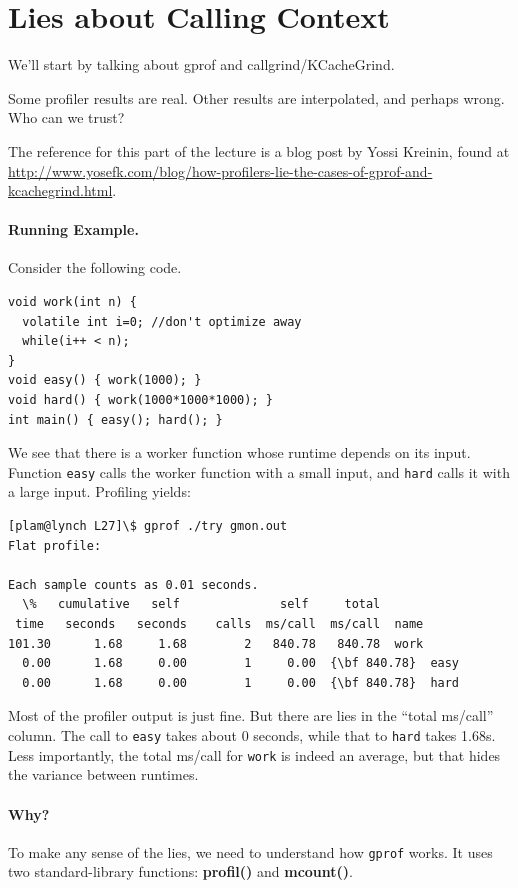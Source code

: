 




\section*{Lies about Calling Context}
We'll start by talking about gprof and callgrind/KCacheGrind.

Some profiler results are real.  Other results are interpolated, and
perhaps wrong. Who can we trust?

The reference for this part of the lecture is a blog post by Yossi Kreinin,
found at \url{http://www.yosefk.com/blog/how-profilers-lie-the-cases-of-gprof-and-kcachegrind.html}.

\paragraph{Running Example.} Consider the following code.

\begin{lstlisting}
void work(int n) {
  volatile int i=0; //don't optimize away
  while(i++ < n);
}
void easy() { work(1000); }
void hard() { work(1000*1000*1000); }
int main() { easy(); hard(); }
\end{lstlisting}

We see that there is a worker function whose runtime depends on its input.
Function {\tt easy} calls the worker function with a small input, and {\tt hard} calls
it with a large input. Profiling yields:
\begin{verbatim}
[plam@lynch L27]\$ gprof ./try gmon.out
Flat profile:

Each sample counts as 0.01 seconds.
  \%   cumulative   self              self     total           
 time   seconds   seconds    calls  ms/call  ms/call  name    
101.30      1.68     1.68        2   840.78   840.78  work
  0.00      1.68     0.00        1     0.00  {\bf 840.78}  easy
  0.00      1.68     0.00        1     0.00  {\bf 840.78}  hard
\end{verbatim}
Most of the profiler output is just fine. But there are lies in the
``total ms/call'' column. The call to {\tt easy} takes about 0 seconds,
while that to {\tt hard} takes 1.68s. Less importantly, the total ms/call for
{\tt work} is indeed an average, but that hides the variance between runtimes.

\paragraph{Why?} To make any sense of the lies, we need to understand how {\tt gprof} works.
It uses two standard-library functions: {\bf profil()} and {\bf mcount()}.

